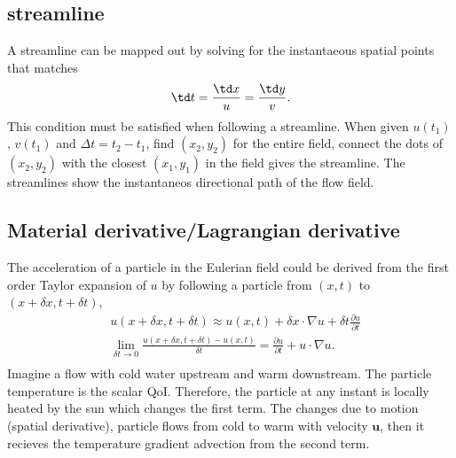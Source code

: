 \subsection{streamline} \begin{derv*} A streamline can be mapped out by solving for the instantaeous
spatial points that matches \begin{equation} \td t = \frac{\td x}{u} = \frac{\td y}{v}.
\end{equation} This condition must be satisfied when following a streamline. When given $u(t_1)$,
$v(t_1)$ and $\Delta t=t_2-t_1$, find $(x_2, y_2)$ for the entire field, connect the dots of
$(x_2,y_2)$ with the closest $(x_1,y_1)$ in the field gives the streamline. The streamlines show the
instantaneos directional path of the flow field.  \end{derv*}



\subsection{Material derivative/Lagrangian derivative} The acceleration of a particle in the
Eulerian field could be derived from the first order Taylor expansion of $u$ by following a particle
from $(x,t)$ to $(x+\delta x,t+\delta t)$, \begin{equation} \begin{aligned} & u(x+\delta x, t+\delta
t) \approx u(x,t) + \delta x \cdot\nabla u + \delta t \frac{\partial u}{\partial t} \\ &
\lim_{\delta t \to 0}\frac{u(x+\delta x, t+\delta t) - u(x,t)}{\delta t} = \frac{\partial
u}{\partial t} + u \cdot \nabla u. \\ \end{aligned} \end{equation} Imagine a flow with cold water
upstream and warm downstream. The particle temperature is the scalar QoI. Therefore, the particle at
any instant is locally heated by the sun which changes the first term. The changes due to motion
(spatial derivative), particle flows from cold to warm with velocity $\bm{u}$, then it recieves the
temperature gradient advection from the second term.

